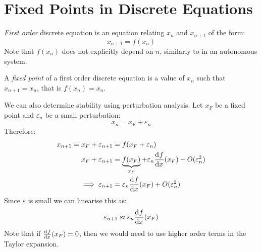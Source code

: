 \documentclass[../main.tex]{subfiles}
\begin{document}
\begin{example}
\begin{center}
  \end{center}
\end{example}
\section{Fixed Points in Discrete Equations}
\begin{definition}
  \textit{First order} discrete equation is an equation relating $x_n$ and $x_{n + 1}$ of the form:
  \[
    x_{n + 1} = f(x_n)
  \]
  Note that $f(x_n)$ does not explicitly depend on $n$, similarly to in an autonomous system.
\end{definition}
\begin{definition}
  A \textit{fixed point} of a first order discrete equation is a value of $x_n$ such that $x_{n + 1} = x_n$, that is $f(x_{n}) = x_{n}$.
\end{definition}
We can also determine stability using perturbation analysis.
Let $x_F$ be a fixed point and $\varepsilon_n$ be a small perturbation:
\[
  x_n = x_F + \varepsilon_n
\]
Therefore:
\begin{align*}
  x_{n + 1} = x_F + \varepsilon_{n + 1} &= f(x_F + \varepsilon_n) \\
  x_F + \varepsilon_{n+1} &= \underbrace{f(x_F)}_{x_F} + \varepsilon_n \deriv{f}{x}(x_F) + O(\varepsilon^{2}_{n}) \\
  \implies \varepsilon_{n+1} & =\varepsilon_n \deriv{f}{x}(x_F) + O(\varepsilon^{2}_{n})
\end{align*}
Since $\varepsilon$ is small we can linearise this as:
\[
  \varepsilon_{n+1} \approx \varepsilon_n \deriv{f}{x}(x_F)
\]
Note that if $\deriv{f}{x}(x_F) = 0$, then we would need to use higher order terms in the Taylor expansion.
\end{document}
